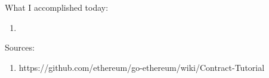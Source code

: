 What I accomplished today:

\begin{enumerate}
	\item 
\end{enumerate}

Sources:

\begin{enumerate}
	\item https://github.com/ethereum/go-ethereum/wiki/Contract-Tutorial
\end{enumerate}



































